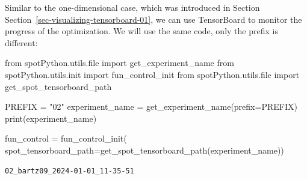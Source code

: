 \documentclass[
  letterpaper,
  DIV=11,
  numbers=noendperiod]{scrreprt}
\newenvironment{Shaded}{\begin{snugshade}}{\end{snugshade}}
\newcommand{\BuiltInTok}[1]{\textcolor[rgb]{0.00,0.23,0.31}{#1}}
\newcommand{\ImportTok}[1]{\textcolor[rgb]{0.00,0.46,0.62}{#1}}
\newcommand{\NormalTok}[1]{\textcolor[rgb]{0.00,0.23,0.31}{#1}}
\newcommand{\OperatorTok}[1]{\textcolor[rgb]{0.37,0.37,0.37}{#1}}
\newcommand{\StringTok}[1]{\textcolor[rgb]{0.13,0.47,0.30}{#1}}
\begin{document}
\begin{tcolorbox}[enhanced jigsaw, opacityback=0, left=2mm, title=\textcolor{quarto-callout-note-color}{\faInfo}\hspace{0.5em}{TensorBoard}, bottomrule=.15mm, titlerule=0mm, arc=.35mm, leftrule=.75mm, colbacktitle=quarto-callout-note-color!10!white, bottomtitle=1mm, opacitybacktitle=0.6, coltitle=black, colframe=quarto-callout-note-color-frame, toprule=.15mm, breakable, colback=white, toptitle=1mm, rightrule=.15mm]

Similar to the one-dimensional case, which was introduced in Section
Section~\ref{sec-visualizing-tensorboard-01}, we can use TensorBoard to
monitor the progress of the optimization. We will use the same code,
only the prefix is different:

\begin{Shaded}
\begin{Highlighting}[]
\ImportTok{from}\NormalTok{ spotPython.utils.}\BuiltInTok{file} \ImportTok{import}\NormalTok{ get\_experiment\_name}
\ImportTok{from}\NormalTok{ spotPython.utils.init }\ImportTok{import}\NormalTok{ fun\_control\_init}
\ImportTok{from}\NormalTok{ spotPython.utils.}\BuiltInTok{file} \ImportTok{import}\NormalTok{ get\_spot\_tensorboard\_path}

\NormalTok{PREFIX }\OperatorTok{=} \StringTok{"02"}
\NormalTok{experiment\_name }\OperatorTok{=}\NormalTok{ get\_experiment\_name(prefix}\OperatorTok{=}\NormalTok{PREFIX)}
\BuiltInTok{print}\NormalTok{(experiment\_name)}

\NormalTok{fun\_control }\OperatorTok{=}\NormalTok{ fun\_control\_init(}
\NormalTok{    spot\_tensorboard\_path}\OperatorTok{=}\NormalTok{get\_spot\_tensorboard\_path(experiment\_name))}
\end{Highlighting}
\end{Shaded}

\begin{verbatim}
02_bartz09_2024-01-01_11-35-51
\end{verbatim}

\end{tcolorbox}
\end{document}
